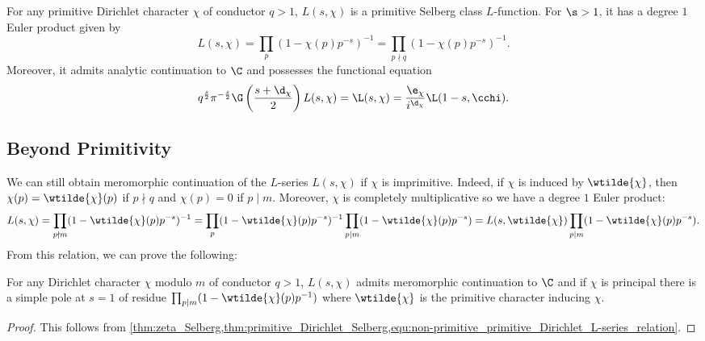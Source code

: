       \begin{theorem}\label{thm:primitive_Dirichlet_Selberg}
        For any primitive Dirichlet character $\chi$ of conductor $q > 1$, $L(s,\chi)$ is a primitive Selberg class $L$-function. For $\s > 1$, it has a degree $1$ Euler product given by
        \[
          L(s,\chi) = \prod_{p}(1-\chi(p)p^{-s})^{-1} = \prod_{p \nmid q}(1-\chi(p)p^{-s})^{-1}.
        \]
        Moreover, it admits analytic continuation to $\C$ and possesses the functional equation
        \[
          q^{\frac{s}{2}}\pi^{-\frac{s}{2}}\G\left(\frac{s+\d_{\chi}}{2}\right)L(s,\chi) = \L(s,\chi) = \frac{\e_{\chi}}{i^{\d_{\chi}}}\L(1-s,\cchi).
        \]
      \end{theorem}
    \subsection*{Beyond Primitivity}
      We can still obtain meromorphic continuation of the $L$-series $L(s,\chi)$ if $\chi$ is imprimitive. Indeed, if $\chi$ is induced by $\wtilde{\chi}$, then $\chi(p) = \wtilde{\chi}(p)$ if $p \nmid q$ and $\chi(p) = 0$ if $p \mid m$. Moreover, $\chi$ is completely multiplicative so we have a degree $1$ Euler product:
      \begin{equation}\label{equ:non-primitive_primitive_Dirichlet_L-series_relation}
        L(s,\chi) = \prod_{p \nmid m}(1-\wtilde{\chi}(p)p^{-s})^{-1} = \prod_{p}(1-\wtilde{\chi}(p)p^{-s})^{-1}\prod_{p \mid m}(1-\wtilde{\chi}(p)p^{-s}) = L(s,\wtilde{\chi})\prod_{p \mid m}(1-\wtilde{\chi}(p)p^{-s}).
      \end{equation}
      From this relation, we can prove the following:

      \begin{theorem}\label{thm:analytic_continuation_Dirichlet}
        For any Dirichlet character $\chi$ modulo $m$ of conductor $q > 1$, $L(s,\chi)$ admits meromorphic continuation to $\C$ and if $\chi$ is principal there is a simple pole at $s = 1$ of residue $\prod_{p \mid m}(1-\wtilde{\chi}(p)p^{-1})$ where $\wtilde{\chi}$ is the primitive character inducing $\chi$.
      \end{theorem}
      \begin{proof}
        This follows from \cref{thm:zeta_Selberg,thm:primitive_Dirichlet_Selberg,equ:non-primitive_primitive_Dirichlet_L-series_relation}. 
      \end{proof}
  \section{}
